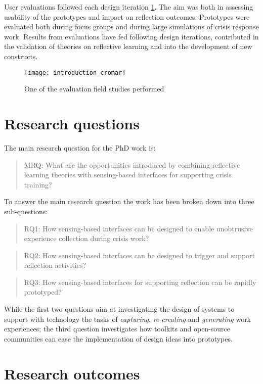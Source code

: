 User evaluations followed each design iteration \ref{fig:cromar}. The aim was both in assessing usability of the prototypes and impact on reflection outcomes. Prototypes were evaluated both during focus groups and during large simulations of crisis response work. Results from evaluations have fed following design iterations, contributed in the validation of theories on reflective learning and into the development of new constructs.
\begin{figure}
	[tbh] \centering 
	\texttt{[image: introduction\_cromar]} 
	\caption{One of the evaluation field studies performed} 
	\label{fig:cromar} 
\end{figure}

\section{Research questions}\label{research-questions}

The main research question for the PhD work is:
\begin{quote}
	MRQ: What are the opportunities introduced by combining reflective learning theories with sensing-based interfaces for supporting crisis training? 
\end{quote}

To answer the main research question the work has been broken down into three sub-questions:
\begin{quote}
	RQ1: How sensing-based interfaces can be designed to enable unobtrusive experience collection during crisis work? 
\end{quote}
\begin{quote}
	RQ2: How sensing-based interfaces can be designed to trigger and support reflection activities? 
\end{quote}
\begin{quote}
	RQ3: How sensing-based interfaces for supporting reflection can be rapidly prototyped? 
\end{quote}

While the first two questions aim at investigating the design of systems to support with technology the tasks of \emph{capturing}, \emph{re-creating} and \emph{generating} work experiences; the third question investigates how toolkits and open-source communities can ease the implementation of design ideas into prototypes.

\section{Research outcomes}\label{research-outcomes}

